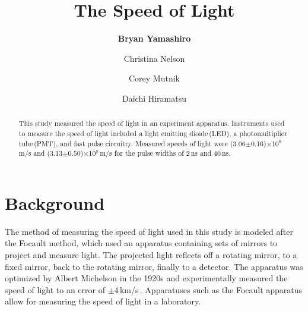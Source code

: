 \documentclass[aps,prl,twocolumn,superscriptaddress]{revtex4-1}
\begin{document}





\title{The Speed of Light}


\author{\textbf{Bryan Yamashiro}}
\author{Christina Nelson}
\author{Corey Mutnik}
\author{Daichi Hiramatsu}






\begin{abstract}

This study measured the speed of light in an experiment apparatus. Instruments used to measure the speed of light included a light emitting dioide\,(LED), a photomultiplier tube\,(PMT), and fast pulse circuitry. Measured speeds of light were (3.06$\pm$0.16)$\times$10$^8$\,m/s and (3.13$\pm$0.50)$\times$10$^8$\,m/s for the pulse widths of 2\,ns and 40\,ns.




\end{abstract}

\maketitle    %


\section{Background}

The method of measuring the speed of light used in this study is modeled after the Focault method, which used an apparatus containing sets of mirrors to project and measure light. The projected light reflects off a rotating mirror, to a fixed mirror, back to the rotating mirror, finally to a detector. The apparatus was optimized by Albert Michelson in the 1920s and experimentally measured the speed of light to an error of $\pm$4\,km/s\,\cite{1}. Apparatuses such as the Focault apparatus allow for measuring the speed of light in a laboratory.
\end{document}
